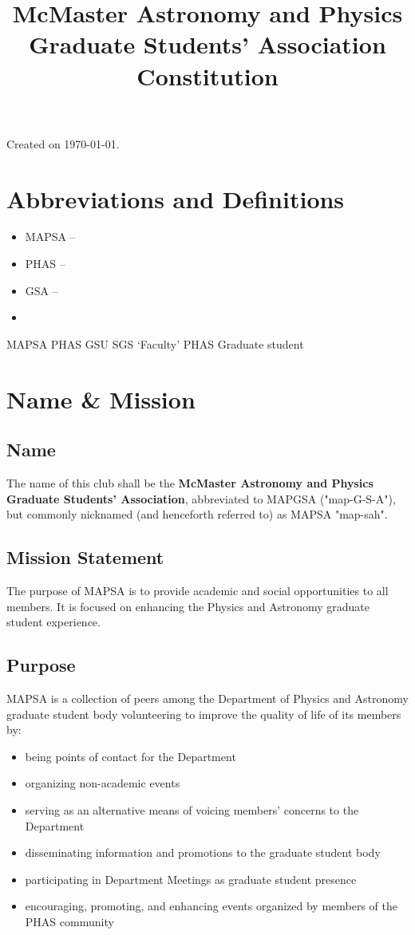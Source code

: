 \documentclass[onecolumn,aps,prd]{revtex4-2}
\begin{document}
		
\title{{McMaster Astronomy and Physics Graduate Students' Association}\\\huge{Constitution}}
\maketitle
Created on \today.
\tableofcontents
\section*{Abbreviations and Definitions}
\begin{itemize}
	\item MAPSA -- 
	\item PHAS --
	\item GSA -- 
	\item 
\end{itemize}
MAPSA
PHAS
GSU
SGS
`Faculty'
PHAS Graduate student
\section{Name \& Mission}
\subsection{Name}The name of this club shall be the \textbf{McMaster Astronomy and Physics Graduate Students' Association}, abbreviated to MAPGSA ("map-G-S-A"), but commonly nicknamed (and henceforth referred to) as MAPSA "map-sah".
\subsection{Mission Statement}
The purpose of MAPSA is to provide academic and social opportunities to all members. It is focused on enhancing
the Physics and Astronomy graduate student experience.
\subsection{Purpose}
MAPSA is a collection of peers among the Department of Physics and Astronomy graduate student body volunteering to improve the quality of life of its members by: 
\begin{itemize}
	\item being points of contact for the Department
	\item organizing non-academic events 
	\item serving as an alternative means of voicing members' concerns to the Department
	\item disseminating information and promotions to the graduate student body
	\item participating in Department Meetings as graduate student presence
	\item encouraging, promoting, and enhancing events organized by members of the PHAS community
\end{itemize}
\end{document}
